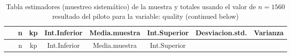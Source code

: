 \documentclass[
]{article}
\begin{document}
\begin{longtable}[]{@{}cccccccc@{}}
\caption{Tabla estimadores (muestreo sistemático) de la muestra y
totales usando el valor de \(n = 1560\) resultado del piloto para la
variable: quality (continued below)}\tabularnewline
\toprule
\begin{minipage}[b]{0.18\columnwidth}\centering
~\strut
\end{minipage} & \begin{minipage}[b]{0.05\columnwidth}\centering
n\strut
\end{minipage} & \begin{minipage}[b]{0.03\columnwidth}\centering
kp\strut
\end{minipage} & \begin{minipage}[b]{0.10\columnwidth}\centering
Int.Inferior\strut
\end{minipage} & \begin{minipage}[b]{0.11\columnwidth}\centering
Media.muestra\strut
\end{minipage} & \begin{minipage}[b]{0.10\columnwidth}\centering
Int.Superior\strut
\end{minipage} & \begin{minipage}[b]{0.12\columnwidth}\centering
Desviacion.std.\strut
\end{minipage} & \begin{minipage}[b]{0.08\columnwidth}\centering
Varianza\strut
\end{minipage}\tabularnewline
\midrule
\endfirsthead
\toprule
\begin{minipage}[b]{0.18\columnwidth}\centering
~\strut
\end{minipage} & \begin{minipage}[b]{0.05\columnwidth}\centering
n\strut
\end{minipage} & \begin{minipage}[b]{0.03\columnwidth}\centering
kp\strut
\end{minipage} & \begin{minipage}[b]{0.10\columnwidth}\centering
Int.Inferior\strut
\end{minipage} & \begin{minipage}[b]{0.11\columnwidth}\centering
Media.muestra\strut
\end{minipage} & \begin{minipage}[b]{0.10\columnwidth}\centering
Int.Superior\strut
\end{minipage} & \begin{minipage}[b]{0.12\columnwidth}\centering

\end{minipage}
\end{longtable}
\end{document}
